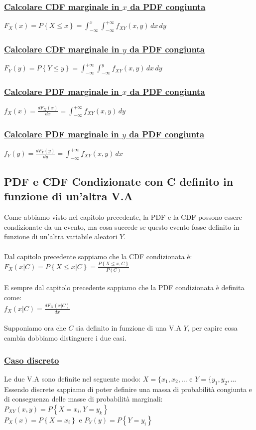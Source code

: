 \documentclass{article}
\begin{document}
\subsubsection{\underline{Calcolare CDF marginale in $x$ da PDF congiunta}}
$F_X(x) = P \left\{X \leq x \right\} = \int_{-\infty}^{x} \int_{-\infty}^{+\infty} f_{XY}(x,y) \,dx \,dy $
\subsubsection{\underline{Calcolare CDF marginale in $y$ da PDF congiunta}}
$F_Y(y) = P \left\{Y \leq y \right\} = \int_{-\infty}^{+\infty} \int_{-\infty}^{y} f_{XY}(x,y) \,dx \,dy $
\subsubsection{\underline{Calcolare PDF marginale in $x$ da PDF congiunta}}
$f_X(x) = \frac{dF_X(x)}{dx} = \int_{-\infty}^{+\infty} f_{XY}(x,y) \,dy$
\subsubsection{\underline{Calcolare PDF marginale in $y$ da PDF congiunta}}
$f_Y(y) = \frac{dF_Y(y)}{dy} = \int_{-\infty}^{+\infty} f_{XY}(x,y) \,dx$

\subsection{PDF e CDF Condizionate con C definito in funzione di un’altra V.A}
Come abbiamo visto nel capitolo precedente, la PDF e la CDF possono essere condizionate da un evento, ma cosa succede se questo evento fosse definito in funzione di un’altra variabile aleatori $Y$. \\ \\
Dal capitolo precedente sappiamo che la CDF condizionata è: \\
$F_X(x|C) = P\left\{X \leq x |C \right\} = \frac{P\left\{X \leq x ,C\right\}}{P(C)}$ \\ \\
E sempre dal capitolo precedente sappiamo che la PDF condizionata è definita come: \\
$f_X(x|C) = \frac{dF_X(x|C)}{dx}$ \\ \\
Supponiamo ora che $C$ sia definito in funzione di una V.A $Y$, per capire cosa cambia dobbiamo distinguere i due casi.
\subsubsection{\underline{Caso discreto}}
Le due V.A sono definite nel seguente modo: $X = \{ x_1,x_2, \dots$ e $Y = \{ y_1, y_2, \dots$ \\
Essendo discrete sappiamo di poter definire una massa di probabilità congiunta e di conseguenza delle masse di probabilità marginali: \\
$P_{XY}(x,y) = P \left\{X = x_i, Y=y_k\right\}$ \\
$P_X(x) = P\left\{X = x_i\right\}$ e $P_Y(y) = P\left\{Y = y_i\right\}$\\
\end{document}
